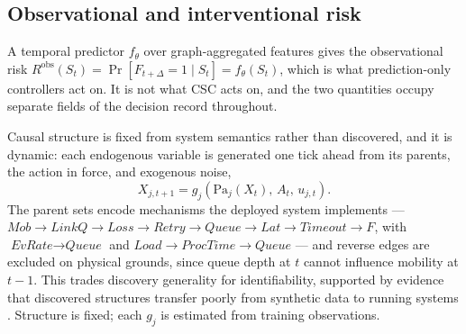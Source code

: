 \documentclass[journal]{IEEEtran}
\begin{document}
\subsection{Observational and interventional risk}
A temporal predictor $f_\theta$ over graph-aggregated features gives the
observational risk $R^{\mathrm{obs}}(S_t)=\Pr[F_{t+\Delta}=1\mid S_t]
=f_\theta(S_t)$, which is what prediction-only controllers act on. It is not
what CSC acts on, and the two quantities occupy separate fields of the decision
record throughout.

Causal structure is fixed from system semantics rather than discovered, and it
is dynamic: each endogenous variable is generated one tick ahead from its
parents, the action in force, and exogenous noise,
\begin{equation}
X_{j,t+1}=g_j\!\left(\mathrm{Pa}_j(X_t),\,A_t,\,u_{j,t}\right).
\label{eq:scm}
\end{equation}
The parent sets encode mechanisms the deployed system implements ---
$\textit{Mob}\!\to\!\textit{LinkQ}\!\to\!\textit{Loss}\!\to\!\textit{Retry}
\!\to\!\textit{Queue}\!\to\!\textit{Lat}\!\to\!\textit{Timeout}\!\to\!F$, with
$\textit{EvRate}\!\to\!\textit{Queue}$ and
$\textit{Load}\!\to\!\textit{ProcTime}\!\to\!\textit{Queue}$ --- and reverse
edges are excluded on physical grounds, since queue depth at $t$ cannot
influence mobility at $t-1$. This trades discovery generality for
identifiability, supported by evidence that discovered structures transfer
poorly from synthetic data to running systems \cite{pham2024rca}. Structure is
fixed; each $g_j$ is estimated from training observations.
\end{document}

